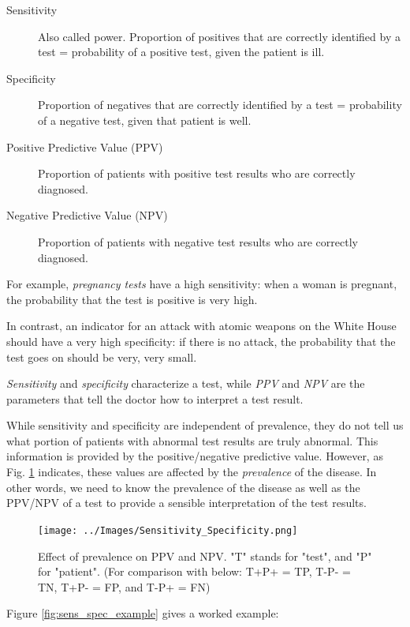 \begin{description}
  \item[Sensitivity] Also called \gls{power}. Proportion of positives that are correctly identified by a test = probability of a positive test, given the patient is ill.
  \item[Specificity] Proportion of negatives that are correctly identified by a test = probability of a negative test, given that patient is well.
  \item[Positive Predictive Value (PPV)] Proportion of patients with positive test results who are correctly diagnosed.
  \item[Negative Predictive Value (NPV)] Proportion of patients with negative test results who are correctly diagnosed.
\end{description}

For example, \emph{pregnancy tests} have a high sensitivity: when a woman is pregnant, the probability that the test is positive is very high.

In contrast, an indicator for an attack with atomic weapons on the White House should have a very high specificity: if there is no attack, the probability that the test goes on should be very, very small.

\emph{Sensitivity} and \emph{specificity} characterize a test, while \emph{PPV} and \emph{NPV} are the parameters that tell the doctor how to interpret a test result.

While sensitivity and specificity are independent of prevalence, they do not tell us what portion of patients with abnormal test results are truly abnormal. This information is provided by the positive/negative predictive value. However, as Fig. \ref{fig:prevalence} indicates, these values are affected by the \emph{prevalence}  of the disease. In other words, we need to know the prevalence of the disease as well as the PPV/NPV of a test to provide a sensible interpretation of the test results.

\begin{figure}[ht]
  \centering
  \texttt{[image: ../Images/Sensitivity\_Specificity.png]}\\
  \caption{Effect of prevalence on PPV and NPV. "T" stands for "test", and "P" for "patient". (For comparison with below: T+P+ = TP, T-P- = TN, T+P- = FP, and T-P+ = FN)} \label{fig:prevalence}
\end{figure}

Figure \ref{fig:sens_spec_example} gives a worked example:

